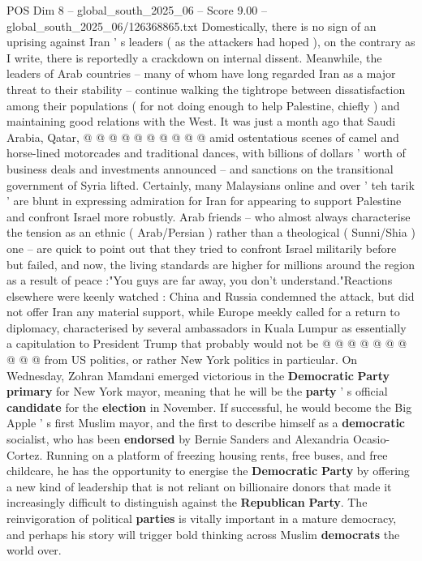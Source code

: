 \begin{textsample}{POS Dim 8 – global\_south\_2025\_06 – Score 9.00 – global\_south\_2025\_06/126368865.txt}
Domestically, there is no sign of an uprising against Iran ' s leaders ( as the attackers had hoped ), on the contrary as I write, there is reportedly a crackdown on internal dissent.
Meanwhile, the leaders of Arab countries -- many of whom have long regarded Iran as a major threat to their stability -- continue walking the tightrope between dissatisfaction among their populations ( for not doing enough to help Palestine, chiefly ) and maintaining good relations with the West.
It was just a month ago that Saudi Arabia, Qatar, @ @ @ @ @ @ @ @ @ @ amid ostentatious scenes of camel and horse-lined motorcades and traditional dances, with billions of dollars ' worth of business deals and investments announced -- and sanctions on the transitional government of Syria lifted.
Certainly, many Malaysians online and over ' teh tarik ' are blunt in expressing admiration for Iran for appearing to support Palestine and confront Israel more robustly.
Arab friends -- who almost always characterise the tension as an ethnic ( Arab/Persian ) rather than a theological ( Sunni/Shia ) one -- are quick to point out that they tried to confront Israel militarily before but failed, and now, the living standards are higher for millions around the region as a result of peace :"You guys are far away, you don't understand."Reactions elsewhere were keenly watched : China and Russia condemned the attack, but did not offer Iran any material support, while Europe meekly called for a return to diplomacy, characterised by several ambassadors in Kuala Lumpur as essentially a capitulation to President Trump that probably would not be @ @ @ @ @ @ @ @ @ @ from US politics, or rather New York politics in particular.
On Wednesday, Zohran Mamdani emerged victorious in the \textbf{Democratic} \textbf{Party} \textbf{primary} for New York mayor, meaning that he will be the \textbf{party} ' s official \textbf{candidate} for the \textbf{election} in November.
If successful, he would become the Big Apple ' s first Muslim mayor, and the first to describe himself as a \textbf{democratic} socialist, who has been \textbf{endorsed} by Bernie Sanders and Alexandria Ocasio-Cortez.
Running on a platform of freezing housing rents, free buses, and free childcare, he has the opportunity to energise the \textbf{Democratic} \textbf{Party} by offering a new kind of leadership that is not reliant on billionaire donors that made it increasingly difficult to distinguish against the \textbf{Republican} \textbf{Party}.
The reinvigoration of political \textbf{parties} is vitally important in a mature democracy, and perhaps his story will trigger bold thinking across Muslim \textbf{democrats} the world over.

\end{textsample}
